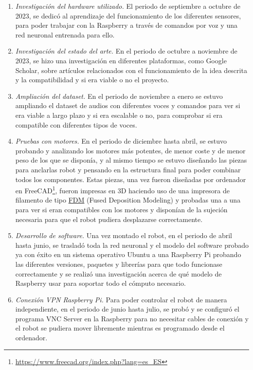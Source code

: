 \begin{enumerate}
 \item \textit{Investigación del hardware utilizado.} El periodo de septiembre a octubre de 2023, se dedicó al aprendizaje del funcionamiento de los diferentes sensores, para poder trabajar con la Raspberry a través de comandos por voz y una red neuronal entrenada para ello.

 \item \textit{Investigación del estado del arte.} En el periodo de octubre a noviembre de 2023, se hizo una investigación en diferentes plataformas, como Google Scholar, sobre artículos relacionados con el funcionamiento de la idea descrita y la compatibilidad y si era viable o no el proyecto.
 
  \item \textit{Ampliación del dataset.} En el periodo de noviembre a enero se estuvo ampliando el dataset de audios con diferentes voces y comandos para ver si era viable a largo plazo y si era escalable o no, para comprobar si era compatible con diferentes tipos de voces.
  
  \item \textit{Pruebas con motores.} En el periodo de diciembre hasta abril, se estuvo probando y analizando los motores más potentes, de menor coste y de menor peso de los que se disponía, y al mismo tiempo se estuvo diseñando las piezas para anclarlas robot y pensando en la estructura final para poder combinar todos los componentes. Estas piezas, una vez fueron diseñadas por ordenador en FreeCAD\footnote{\url{https://www.freecad.org/index.php?lang=es_ES}}, fueron impresas en 3D haciendo uso de una impresora de filamento de tipo \hyperlink{FDM}{FDM} (Fused Deposition Modeling) y probadas una a una para ver si eran compatibles con los motores y disponían de la sujeción necesaria para que el robot pudiera desplazarse correctamente.
  
 \item \textit{Desarrollo de software.} Una vez montado el robot, en el periodo de abril hasta junio, se trasladó toda la red neuronal y el modelo del software probado ya con éxito en un sistema operativo Ubuntu a una Raspberry Pi probando las diferentes versiones, paquetes y librerías para que todo funcionase correctamente y se realizó una investigación acerca de qué modelo de Raspberry usar para soportar todo el cómputo necesario.
 
  \item \textit{Conexión VPN Raspberry Pi.} Para poder controlar el robot de manera independiente, en el periodo de junio hasta julio, se probó y se configuró el programa VNC Server en la Raspberry para no necesitar cables de conexión y el robot se pudiera mover libremente mientras es programado desde el ordenador.
  

\end{enumerate}
